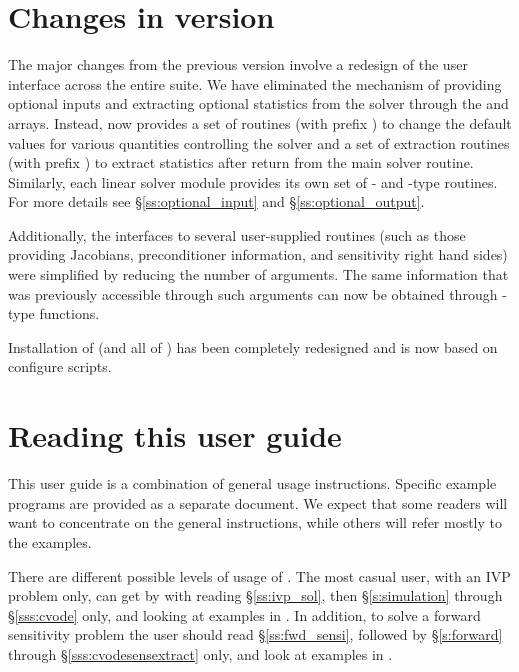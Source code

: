 \section{Changes in version {\cvsrelease}}
The major changes from the previous version involve a redesign of the
user interface across the entire {\sundials} suite. We have eliminated the
mechanism of providing optional inputs and extracting optional statistics 
from the solver through the  and  arrays. Instead,
{\cvodes} now provides a set of routines (with prefix )
to change the default values for various quantities controlling the
solver and a set of extraction routines (with prefix )
to extract statistics after return from the main solver routine.
Similarly, each linear solver module provides its own set of {-}
and {-type} routines. For more details see \S\ref{ss:optional_input}
and \S\ref{ss:optional_output}.

Additionally, the interfaces to several user-supplied routines
(such as those providing Jacobians, preconditioner information, and
sensitivity right hand sides) were simplified by reducing the number
of arguments. The same information that was previously accessible
through such arguments can now be obtained through {-type}
functions.

Installation of {\cvodes} (and all of {\sundials}) has been completely 
redesigned and is now based on configure scripts.

\section{Reading this user guide}\label{ss:reading}

This user guide is a combination of general usage instructions.
Specific example programs are provided as a separate document.
We expect that some readers will want to concentrate on the general 
instructions, while others will refer mostly to the examples.

There are different possible levels of usage of {\cvodes}. The most casual
user, with an IVP problem only, can get by with reading \S\ref{ss:ivp_sol}, 
then \S\ref{s:simulation} through \S\ref{sss:cvode} only, and looking at examples 
in \cite{cvodes1.1_ex}.
In addition, to solve a forward sensitivity problem the user should read 
\S\ref{ss:fwd_sensi}, followed by \S\ref{s:forward} through 
\S\ref{sss:cvodesensextract} only, and look at examples in \cite{cvodes1.1_ex}.

